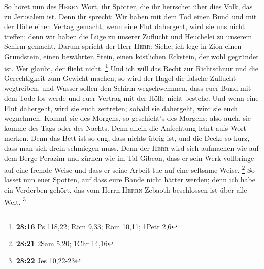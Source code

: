  So höret nun des \textsc{Herrn} Wort, ihr Spötter, die
ihr herrschet über dies Volk, das zu Jerusalem ist.  Denn
ihr sprecht: Wir haben mit dem Tod einen Bund und mit der Hölle einen
Vertag gemacht; wenn eine Flut dahergeht, wird sie uns nicht treffen;
denn wir haben die Lüge zu unserer Zuflucht und Heuchelei zu unserem
Schirm gemacht.  Darum spricht der Herr \textsc{Herr}:
Siehe, ich lege in Zion einen Grundstein, einen bewährten Stein, einen
köstlichen Eckstein, der wohl gegründet ist. Wer glaubt, der flieht
nicht. \footnote{\textbf{28:16} Ps 118,22; Röm 9,33; Röm 10,11; 1Petr
  2,6}  Und ich will das Recht zur Richtschnur und die
Gerechtigkeit zum Gewicht machen; so wird der Hagel die falsche Zuflucht
wegtreiben, und Wasser sollen den Schirm wegschwemmen, 
dass euer Bund mit dem Tode los werde und euer Vertrag mit der Hölle
nicht bestehe. Und wenn eine Flut dahergeht, wird sie euch zertreten;
sobald sie dahergeht, wird sie euch wegnehmen.  Kommt sie
des Morgens, so geschieht's des Morgens; also auch, sie komme des Tags
oder des Nachts. Denn allein die Anfechtung lehrt aufs Wort merken.
 Denn das Bett ist so eng, dass nichts übrig ist, und die
Decke so kurz, dass man sich drein schmiegen muss.  Denn
der \textsc{Herr} wird sich aufmachen wie auf dem Berge Perazim und
zürnen wie im Tal Gibeon, dass er sein Werk vollbringe auf eine fremde
Weise und dass er seine Arbeit tue auf eine seltsame Weise. \footnote{\textbf{28:21}
  2Sam 5,20; 1Chr 14,16}  So lasset nun euer Spotten, auf
dass eure Bande nicht härter werden; denn ich habe ein Verderben gehört,
das vom Herrn \textsc{Herrn} Zebaoth beschlossen ist über alle Welt.
\footnote{\textbf{28:22} Jes 10,22-23}

